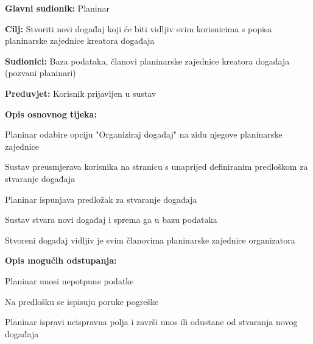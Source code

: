 			\noindent {}
		\begin{packed_item}
			
			\item \textbf{Glavni sudionik: }$ $Planinar$ $
			\item  \textbf{Cilj:} $ $Stvoriti novi događaj koji će biti vidljiv svim korisnicima s popisa planinarske zajednice kreatora događaja$ $
			\item  \textbf{Sudionici:} $ $Baza podataka, članovi planinarske zajednice kreatora događaja (pozvani planinari)$ $
			\item  \textbf{Preduvjet:} $ $Korisnik prijavljen u sustav$ $
			\item  \textbf{Opis osnovnog tijeka:}
			
			\item[] \begin{packed_enum}
				
				\item $ $Planinar odabire opciju "Organiziraj događaj" na zidu njegove planinarske zajednice$ $
				\item $ $Sustav preusmjerava korisnika na stranicu s unaprijed definiranim predloškom za stvaranje događaja$ $
				\item $ $Planinar ispunjava predložak za stvaranje događaja$ $	
				\item $ $Sustav stvara novi događaj i sprema ga u bazu podataka$ $
				\item $ $Stvoreni događaj vidljiv je svim članovima planinarske zajednice organizatora$ $ 
			\end{packed_enum}
			\item  \textbf{Opis mogućih odstupanja:}
			
			\item[] \begin{packed_item}
				
				\item[3.a] $ $Planinar unosi nepotpune podatke$ $
				\item[] \begin{packed_enum}
					\item $ $Na predlošku se ispisuju poruke pogreške$ $
					\item $ $Planinar ispravi neispravna polja i završi unos ili odustane od stvaranja novog događaja$ $
				\end{packed_enum}
			\end{packed_item}
		\end{packed_item}
	
